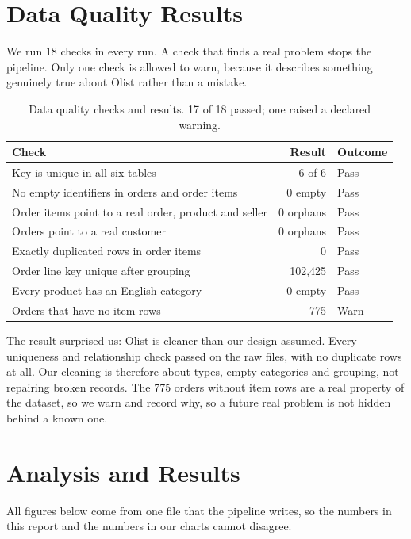 \documentclass[11pt,a4paper]{article}
\begin{document}
\section{Data Quality Results}
We run 18 checks in every run. A check that finds a real problem stops the pipeline. Only one
check is allowed to warn, because it describes something genuinely true about Olist rather than
a mistake.

\begin{table}[h]
\centering\small
\begin{tabular}{@{}p{9.0cm}rl@{}}
\toprule
\textbf{Check} & \textbf{Result} & \textbf{Outcome} \\
\midrule
Key is unique in all six tables & 6 of 6 & Pass \\
No empty identifiers in orders and order items & 0 empty & Pass \\
Order items point to a real order, product and seller & 0 orphans & Pass \\
Orders point to a real customer & 0 orphans & Pass \\
Exactly duplicated rows in order items & 0 & Pass \\
Order line key unique after grouping & 102{,}425 & Pass \\
Every product has an English category & 0 empty & Pass \\
Orders that have no item rows & 775 & Warn \\
\bottomrule
\end{tabular}
\caption{Data quality checks and results. 17 of 18 passed; one raised a declared warning.}
\end{table}

The result surprised us: Olist is cleaner than our design assumed. Every uniqueness and
relationship check passed on the raw files, with no duplicate rows at all. Our cleaning is
therefore about types, empty categories and grouping, not repairing broken records. The 775
orders without item rows are a real property of the dataset, so we warn and record why, so a
future real problem is not hidden behind a known one.

\section{Analysis and Results}
All figures below come from one file that the pipeline writes, so the numbers in this report and
the numbers in our charts cannot disagree.
\end{document}
